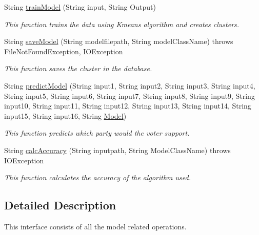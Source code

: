 \begin{DoxyCompactItemize}
\item 
String \hyperlink{interfaceorg_1_1jboss_1_1as_1_1quickstarts_1_1greeter_1_1domain_1_1_model_dao_aef8db8a9057a95cc0a3bb027843b609d}{train\+Model} (String input, String Output)
\begin{DoxyCompactList}\small\item\em This function trains the data using Kmeans algorithm and creates clusters. \end{DoxyCompactList}\item 
String \hyperlink{interfaceorg_1_1jboss_1_1as_1_1quickstarts_1_1greeter_1_1domain_1_1_model_dao_acf8fb2e59848570f96989b86d8dad6c6}{save\+Model} (String modelfilepath, String model\+Class\+Name)  throws File\+Not\+Found\+Exception, I\+O\+Exception
\begin{DoxyCompactList}\small\item\em This function saves the cluster in the database. \end{DoxyCompactList}\item 
String \hyperlink{interfaceorg_1_1jboss_1_1as_1_1quickstarts_1_1greeter_1_1domain_1_1_model_dao_ac57ecc08e389fcc50bd26a3fbe579de3}{predict\+Model} (String input1, String input2, String input3, String input4, String input5, String input6, String input7, String input8, String input9, String input10, String input11, String input12, String input13, String input14, String input15, String input16, String \hyperlink{classorg_1_1jboss_1_1as_1_1quickstarts_1_1greeter_1_1domain_1_1_model}{Model})
\begin{DoxyCompactList}\small\item\em This function predicts which party would the voter support. \end{DoxyCompactList}\item 
String \hyperlink{interfaceorg_1_1jboss_1_1as_1_1quickstarts_1_1greeter_1_1domain_1_1_model_dao_afb454f408ff6b9892a5d6e59cddca2c0}{calc\+Accuracy} (String inputpath, String Model\+Class\+Name)  throws I\+O\+Exception
\begin{DoxyCompactList}\small\item\em This function calculates the accuracy of the algorithm used. \end{DoxyCompactList}\end{DoxyCompactItemize}


\subsection{Detailed Description}
This interface consists of all the model related operations. 

